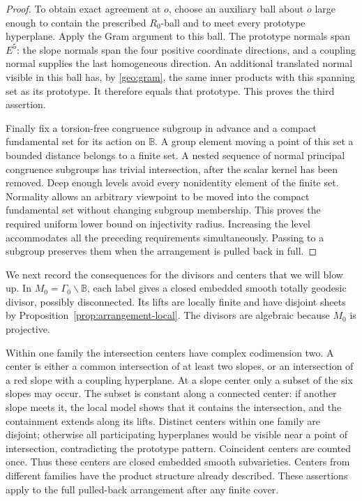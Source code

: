 \documentclass[11pt,reqno]{amsart}
\numberwithin{equation}{section}
\theoremstyle{definition}
\theoremstyle{remark}
\begin{document}
\begin{proof}
To obtain exact agreement at $o$, choose an auxiliary ball about $o$
large enough to contain the prescribed $R_0$-ball and to meet every
prototype hyperplane.  Apply the Gram argument to this ball.  The
prototype normals span $E^5$: the slope normals span the four positive
coordinate directions, and a coupling normal supplies the last
homogeneous direction.  An additional translated normal visible in
this ball has, by \eqref{geo:gram}, the same inner products with this
spanning set as its prototype.  It therefore equals that prototype.
This proves the third assertion.

Finally fix a torsion-free congruence subgroup in advance and a compact
fundamental set for its action on $\mathbb B$.  A group element moving a point
of this set a bounded distance belongs to a finite set.  A nested
sequence of normal principal congruence subgroups has trivial
intersection, after the scalar kernel has been removed.  Deep enough
levels avoid every nonidentity element of the finite set.  Normality
allows an arbitrary viewpoint to be moved into the compact fundamental
set without changing subgroup membership.  This proves the required
uniform lower bound on injectivity radius.  Increasing the level
accommodates all the preceding requirements simultaneously.  Passing
to a subgroup preserves them when the arrangement is pulled back in
full.
\end{proof}

We next record the consequences for the divisors and centers that we
will blow up.  In $M_0=\Gamma_0\backslash\mathbb B$, each label gives a closed
embedded smooth totally geodesic divisor, possibly disconnected.  Its
lifts are locally finite and have disjoint sheets by
Proposition~\ref{prop:arrangement-local}.  The divisors are algebraic
because $M_0$ is projective.

Within one family the intersection centers have complex codimension
two.  A center is either a common intersection of at least two slopes,
or an intersection of a red slope with a coupling hyperplane.  At a
slope center only a subset of the six slopes may occur.  The subset is
constant along a connected center: if another slope meets it, the
local model shows that it contains the intersection, and the
containment extends along its lifts.  Distinct centers within one
family are disjoint; otherwise all participating hyperplanes would be
visible near a point of intersection, contradicting the prototype
pattern.  Coincident centers are counted once.  Thus these centers are
closed embedded smooth subvarieties.  Centers from different families
have the product structure already described.  These assertions apply
to the full pulled-back arrangement after any finite cover.
\end{document}
